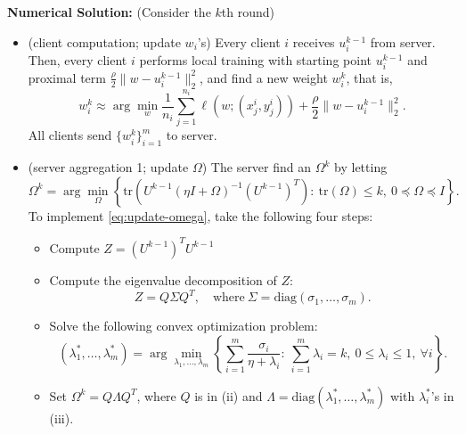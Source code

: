 {\medskip
\noindent
{\bf Numerical Solution:} (Consider the $k$th round)
\begin{itemize}
    \item[Step 1.] (client computation; update $w_i$'s) Every client $i$ receives $u_i^{k-1}$ from server. Then, every client $i$ performs local training with starting point  $u_i^{k-1}$ and proximal term $\frac{\rho}{2}\|w - u_i^{k-1}\|_2^2$, and find a new weight $w_i^k$, that is,
    \begin{equation}
    \label{eq:local-clients}
    w_i^k \approx \arg\min_w \frac{1}{n_i}\sum_{j=1}^{n_i}\ell(w; (x_j^i, y_j^i)) + \frac{\rho}{2}\|w - u_i^{k-1}\|_2^2.
    \end{equation}
    All clients send $\{w_i^k\}_{i=1}^m$ to server.
    \medskip
    
    \item[Step 2.] (server aggregation 1; update $\Omega$) The server find an $\Omega^k$ by letting
    \begin{equation}
        \label{eq:update-omega}
        \Omega^k = \arg\min_\Omega \left\{\mbox{tr}(U^{k-1}(\eta I + \Omega)^{-1}(U^{k-1})^T) : \ \mbox{tr}(\Omega) \leq k, \ 0\preceq\Omega\preceq I\right\}.
    \end{equation}
    To implement \eqref{eq:update-omega}, take the following four steps:
    \begin{itemize}
        \item[(i)] Compute $Z = (U^{k-1})^TU^{k-1}$
        \item[(ii)] Compute the eigenvalue decomposition of $Z$: 
        $$ Z = Q\Sigma Q^T, \quad  \mbox{where} \  \Sigma = \mbox{diag}(\sigma_1,\dots,\sigma_m). $$
        \item[(iii)] Solve the following convex optimization problem:
        \begin{equation}
            \label{eq:lambda-solve}
            (\lambda_1^*, \dots, \lambda_m^*) = \arg\min_{\lambda_1,\dots,\lambda_m} \left\{ \sum_{i=1}^m \frac{\sigma_i}{\eta + \lambda_i}: \ \sum_{i=1}^m \lambda_i = k, \ 0\leq \lambda_i \leq 1, \ \forall i\right\}.
        \end{equation}
        \item[(iv)] Set $\Omega^k = Q\Lambda Q^T$, where $Q$ is in (ii) and $\Lambda = \mbox{diag}(\lambda_1^*, \dots, \lambda_m^*)$ with $\lambda_i^*$'s in (iii).
    \end{itemize}
    \medskip
    

\end{itemize}}
